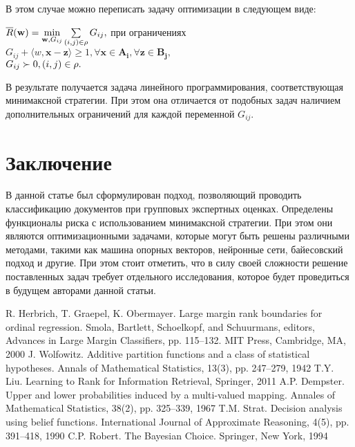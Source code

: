 \documentclass[12pt,a4paper,oneside]{article}
\begin{document}
\begin{multicols}{2}
В этом случае можно переписать задачу оптимизации в следующем виде:
\begin{center}
\(\overline{R}(\mathbf{w}) = \underset{\mathbf{w}, G_{ij}}{\operatorname{min}} \sum \limits_{(i, j) \in \mathrm{\rho}} G_{ij},\) при ограничениях\\
\(G_{ij} + \langle w, \mathbf{x} - \mathbf{z} \rangle \geq 1, \forall \mathbf{x} \in \mathbf{A_i}, \forall \mathbf{z} \in \mathbf{B_j}, \)\\
\(G_{ij} \succ 0, (i, j) \in \mathrm{\rho}.\)
\end{center}

\par
В результате получается задача линейного программирования, соответствующая минимаксной стратегии. 
При этом она отличается от подобных задач наличием дополнительных ограничений для каждой переменной \(G_{ij}\). 


\vspace*{1em}
\chapter{Заключение}

\par
В данной статье был сформулирован подход, позволяющий проводить классификацию документов при групповых экспертных оценках. 
Определены функционалы риска с использованием минимаксной стратегии. 
При этом они являются оптимизационными задачами, которые могут быть решены различными методами, такими как машина опорных векторов, нейронные сети, байесовский подход и другие. 
При этом стоит отметить, что в силу своей сложности решение поставленных задач требует отдельного исследования, которое будет проведиться в будущем авторами данной статьи. 


\begin{footnotesize}
\begin{thebibliography}{9}
	 R. Herbrich, T. Graepel, K. Obermayer. Large margin rank boundaries for ordinal regression. Smola, Bartlett, Schoelkopf, and Schuurmans, editors, Advances in Large Margin Classifiers, pp. 115–132. MIT Press, Cambridge, MA, 2000%
	 J. Wolfowitz. Additive partition functions and a class of statistical hypotheses. Annals of Mathematical Statistics, 13(3), pp. 247–279, 1942%
	 T.Y. Liu. Learning to Rank for Information Retrieval, Springer, 2011%
	 A.P. Dempster. Upper and lower probabilities induced by a multi-valued mapping. Annales of Mathematical Statistics, 38(2), pp. 325–339, 1967%
	 T.M. Strat. Decision analysis using belief functions. International Journal of Approximate Reasoning, 4(5), pp. 391–418, 1990%
	 C.P. Robert. The Bayesian Choice. Springer, New York, 1994%
\end{thebibliography}
\end{footnotesize}

\end{multicols}
\end{document}
